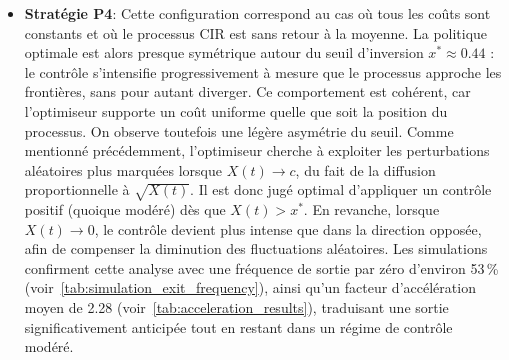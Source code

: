 \begin{itemize}
    \item \textbf{Stratégie P4}: Cette configuration correspond au cas où tous les coûts sont constants et où le processus \acs{CIR} est sans retour à la moyenne. La politique optimale est alors presque symétrique autour du seuil d'inversion $x^* \approx 0.44$ : le contrôle s'intensifie progressivement à mesure que le processus approche les frontières, sans pour autant diverger. Ce comportement est cohérent, car l'optimiseur supporte un coût uniforme quelle que soit la position du processus. On observe toutefois une légère asymétrie du seuil. Comme mentionné précédemment, l'optimiseur cherche à exploiter les perturbations aléatoires plus marquées lorsque $X(t) \to c$, du fait de la diffusion proportionnelle à $\sqrt{X(t)}$. Il est donc jugé optimal d'appliquer un contrôle positif (quoique modéré) dès que $X(t) > x^*$. En revanche, lorsque $X(t) \to 0$, le contrôle devient plus intense que dans la direction opposée, afin de compenser la diminution des fluctuations aléatoires. Les simulations confirment cette analyse avec une fréquence de sortie par zéro d'environ 53\,\% (voir~\ref{tab:simulation_exit_frequency}), ainsi qu'un facteur d'accélération moyen de 2.28 (voir~\ref{tab:acceleration_results}), traduisant une sortie significativement anticipée tout en restant dans un régime de contrôle modéré.

\end{itemize}
